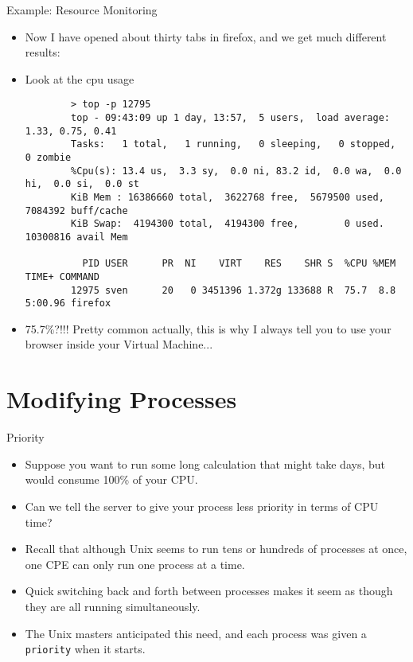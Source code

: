 \begin{frame}[fragile]{Example: Resource Monitoring}
  \begin{itemize}[<+- | alert@+>]
    \item Now I have opened about thirty tabs in firefox, and we get much different results:
    \item Look at the cpu usage
      \begin{verbatim}
        > top -p 12795
        top - 09:43:09 up 1 day, 13:57,  5 users,  load average: 1.33, 0.75, 0.41
        Tasks:   1 total,   1 running,   0 sleeping,   0 stopped,   0 zombie
        %Cpu(s): 13.4 us,  3.3 sy,  0.0 ni, 83.2 id,  0.0 wa,  0.0 hi,  0.0 si,  0.0 st
        KiB Mem : 16386660 total,  3622768 free,  5679500 used,  7084392 buff/cache
        KiB Swap:  4194300 total,  4194300 free,        0 used. 10300816 avail Mem

          PID USER      PR  NI    VIRT    RES    SHR S  %CPU %MEM     TIME+ COMMAND
        12975 sven      20   0 3451396 1.372g 133688 R  75.7  8.8   5:00.96 firefox
      \end{verbatim}
    \item 75.7\%?!!! Pretty common actually, this is why I always tell you to use your browser inside your
          Virtual Machine...
  \end{itemize}
\end{frame}

%

%
\section{Modifying Processes}
\label{sec:modifying_processes}

\begin{frame}[fragile]{Priority}
  \begin{itemize}[<+- | alert@+>]
    \item Suppose you want to run some long calculation that might take days, but would consume 100\% of your
          CPU.
    \item Can we tell the server to give your process less priority in terms of CPU time?
    \item Recall that although Unix seems to run tens or hundreds of processes at once, one CPE can only run
          one process at a time\tsup{*}.
    \item Quick switching back and forth between processes makes it seem as though they are all running simultaneously.
    \item The Unix masters anticipated this need, and each process was given a \texttt{priority} when it starts.
  \end{itemize}
\end{frame}

